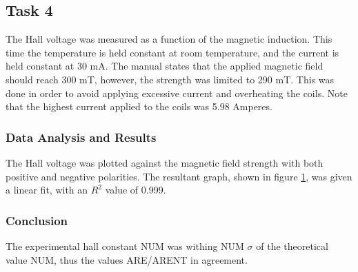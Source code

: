 \documentclass[a4paper]{article}
\begin{document}
\subsection{Task 4}

\qq The Hall voltage was measured as a function of the magnetic
induction. This time the temperature is held constant at room
temperature, and the current is held constant at 30 mA. The manual
states that the applied magnetic field should reach 300 mT,
however, the strength was limited to 290 mT. This was done in
order to avoid applying excessive current and overheating the coils. 
Note that the highest current applied to the coils was 5.98
Amperes.

\subsubsection{Data Analysis and Results}
\qq The Hall voltage was plotted against the magnetic field strength
with both positive and negative polarities. The resultant graph, shown in figure \ref{task24plot}, was
given a linear fit, with an $R^2$ value of 0.999.

\begin{figure}[H]
\centering
\label{task24plot}
\end{figure}








\subsubsection{Conclusion}
The experimental hall constant NUM was withing NUM $\sigma$ of the theoretical value NUM, thus the values ARE/ARENT in agreement.
\end{document}
